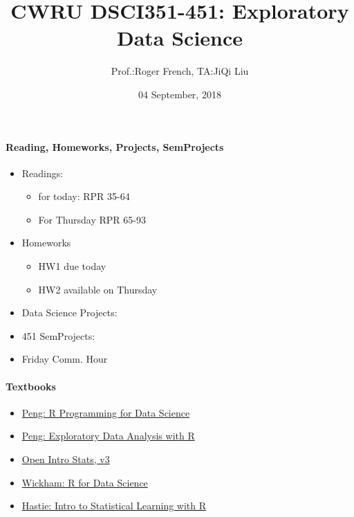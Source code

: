 \documentclass[]{article}
\title{CWRU DSCI351-451: Exploratory Data Science}
\author{Prof.:Roger French, TA:JiQi Liu}
\date{04 September, 2018}
\providecommand{\tightlist}{%
  \setlength{\itemsep}{0pt}\setlength{\parskip}{0pt}}
\let\oldparagraph\paragraph
\renewcommand{\paragraph}[1]{\oldparagraph{#1}\mbox{}}
\begin{document}
\maketitle

{
\hypersetup{linkcolor=black}
\setcounter{tocdepth}{6}
\tableofcontents
}
\setcounter{section}{2} \setcounter{subsection}{1}
\setcounter{subsubsection}{1}

\hypertarget{reading-homeworks-projects-semprojects}{%
\paragraph{Reading, Homeworks, Projects,
SemProjects}\label{reading-homeworks-projects-semprojects}}

\begin{itemize}
\item
  Readings:

  \begin{itemize}
  \tightlist
  \item
    for today: RPR 35-64
  \item
    For Thursday RPR 65-93
  \end{itemize}
\item
  Homeworks

  \begin{itemize}
  \tightlist
  \item
    HW1 due today
  \item
    HW2 available on Thursday
  \end{itemize}
\item
  Data Science Projects:
\item
  451 SemProjects:
\item
  Friday Comm. Hour
\end{itemize}

\hypertarget{textbooks}{%
\paragraph{Textbooks}\label{textbooks}}

\begin{itemize}
\tightlist
\item
  \href{https://play.google.com/books/reader?printsec=frontcover\&output=reader\&id=F1mVHgAAAEAJ\&pg=GBS.PA1}{Peng:
  R Programming for Data Science}
\item
  \href{https://play.google.com/books/reader?printsec=frontcover\&output=reader\&id=R-09BgAAAEAJ\&pg=GBS.PA1}{Peng:
  Exploratory Data Analysis with R}
\item
  \href{https://play.google.com/books/reader?printsec=frontcover\&output=reader\&id=G2EOBwAAAEAJ\&pg=GBS.PA0}{Open
  Intro Stats, v3}
\item
  \href{https://play.google.com/books/reader?printsec=frontcover\&output=reader\&id=I6y3DQAAQBAJ\&pg=GBS.PA1}{Wickham:
  R for Data Science}
\item
  \href{https://play.google.com/books/reader?printsec=frontcover\&output=reader\&id=KtuPCwAAAEAJ\&pg=GBS.PA0}{Hastie:
  Intro to Statistical Learning with R}
\end{itemize}
\end{document}
